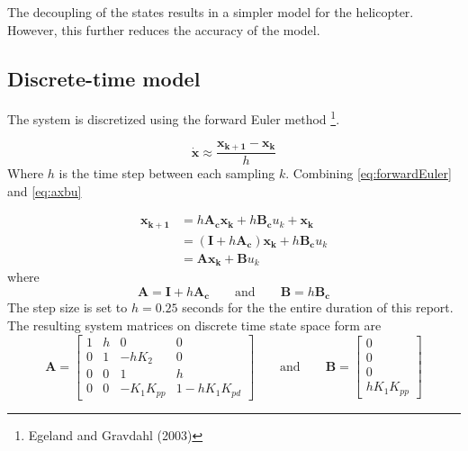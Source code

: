\documentclass[11pt,a4paper,USenglish]{article} %
\begin{document}
The decoupling of the states results in a simpler model for the helicopter. However, this further reduces the accuracy of the model.

\subsection{Discrete-time model}
The system is discretized using the forward Euler method \footnote{Egeland and Gravdahl (2003)}.

\begin{equation}
    \mathbf{\dot{x}} \approx \frac{\mathbf{x_{k+1}} - \mathbf{x_k}}{h}
    \label{eq:forwardEuler}
\end{equation}
Where $h$ is the time step between each sampling $k$. Combining \eqref{eq:forwardEuler} and \eqref{eq:axbu}

\begin{align}
\label{eq:discretization}
    	\mathbf{x_{k+1}} &= h\mathbf{A_{c}x_{k}}+h\mathbf{B_{c}}u_{k}+\mathbf{x_k}\\
        &=(\mathbf{I} + h\mathbf{A_c}) \mathbf{x_k} + h\mathbf{B_c} u_k \nonumber \\
        &=\mathbf{A x_k} + \mathbf{B} u_k \nonumber
\end{align}
where
\begin{equation}
    \mathbf{A} = \mathbf{I} + h\mathbf{A_c}
    \qquad\text{and}\qquad
    \mathbf{B} = h\mathbf{B_c}
\end{equation}
The step size is set to $h = 0.25$ seconds for the the entire duration of this report.
The resulting system matrices on discrete time state space form are
\begin{equation}
    \mathbf{A} = \begin{bmatrix} 1 & h & 0 & 0 \\ 0 & 1 & -hK_2 & 0 \\ 0 & 0 & 1 & h \\ 0 & 0 & -K_1K_{pp} & 1-hK_1K_{pd} \end{bmatrix}
    \qquad\text{and}\qquad
    \mathbf{B} = \begin{bmatrix}0 \\ 0 \\ 0 \\hK_1K_{pp} \end{bmatrix}
\end{equation}
\end{document}
